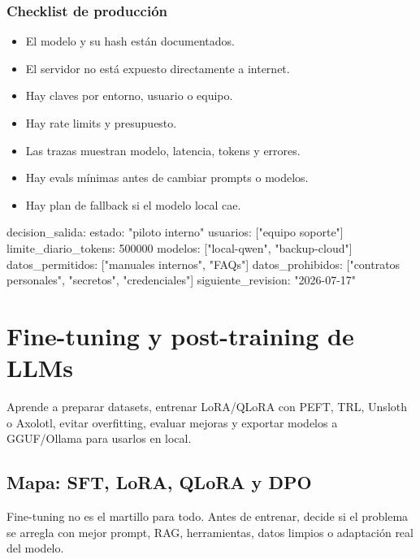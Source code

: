 \documentclass[11pt,a4paper]{book}
\begin{document}
\section{Checklist de producción}
\begin{itemize}\item El modelo y su hash están documentados.\end{itemize}
\begin{itemize}\item El servidor no está expuesto directamente a internet.\end{itemize}
\begin{itemize}\item Hay claves por entorno, usuario o equipo.\end{itemize}
\begin{itemize}\item Hay rate limits y presupuesto.\end{itemize}
\begin{itemize}\item Las trazas muestran modelo, latencia, tokens y errores.\end{itemize}
\begin{itemize}\item Hay evals mínimas antes de cambiar prompts o modelos.\end{itemize}
\begin{itemize}\item Hay plan de fallback si el modelo local cae.\end{itemize}
\begin{codebox}
decision_salida:
  estado: "piloto interno"
  usuarios: ["equipo soporte"]
  limite_diario_tokens: 500000
  modelos: ["local-qwen", "backup-cloud"]
  datos_permitidos: ["manuales internos", "FAQs"]
  datos_prohibidos: ["contratos personales", "secretos", "credenciales"]
  siguiente_revision: "2026-07-17"
\end{codebox}
\part{Fine-tuning y post-training de LLMs}
Aprende a preparar datasets, entrenar LoRA/QLoRA con PEFT, TRL, Unsloth o Axolotl, evitar overfitting, evaluar mejoras y exportar modelos a GGUF/Ollama para usarlos en local.

\chapter{Mapa: SFT, LoRA, QLoRA y DPO}
Fine-tuning no es el martillo para todo. Antes de entrenar, decide si el problema se arregla con mejor prompt, RAG, herramientas, datos limpios o adaptación real del modelo.
\end{document}
